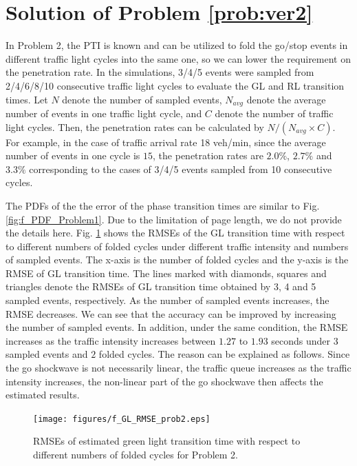 \documentclass[final,oneside,onecolumn,12pt,a4paper]{book}%
\begin{document}
\section{Solution of Problem \ref{prob:ver2}}

In Problem 2, the PTI is known and can be utilized to fold the go/stop events
in different traffic light cycles into the same one, so we can lower the
requirement on the penetration rate. In the simulations, 3/4/5 events were
sampled from 2/4/6/8/10 consecutive traffic light cycles to evaluate the GL
and RL transition times. Let $N$ denote the number of sampled events,
$N_{avg}$ denote the average number of events in one traffic light cycle, and
$C$ denote the number of traffic light cycles. Then, the penetration rates can
be calculated by $N/\left(  N_{avg}\times C\right)  $. For example, in the
case of traffic arrival rate 18 veh/min, since the average number of events in
one cycle is $15$, the penetration rates are $2.0\%$, $2.7\%$ and $3.3\%$
corresponding to the cases of 3/4/5 events sampled from 10 consecutive cycles.

The PDFs of the the error of the phase transition times are similar to Fig.
\ref{fig:f_PDF_Problem1}. Due to the limitation of page length, we do not
provide the details here. Fig. \ref{fig:f_GL_RMSE_prob2} shows the RMSEs of
the GL transition time with respect to different numbers of folded cycles
under different traffic intensity and numbers of sampled events. The x-axis is
the number of folded cycles and the y-axis is the RMSE of GL transition time.
The lines marked with diamonds, squares and triangles denote the RMSEs of GL
transition time obtained by 3, 4 and 5 sampled events, respectively. As the
number of sampled events increases, the RMSE decreases. We can see that the
accuracy can be improved by increasing the number of sampled events. In
addition, under the same condition, the RMSE increases as the traffic
intensity increases between $1.27$ to $1.93$ seconds under $3$ sampled events
and $2$ folded cycles. The reason can be explained as follows. Since the go
shockwave is not necessarily linear, the traffic queue increases as the
traffic intensity increases, the non-linear part of the go shockwave then
affects the estimated results.\begin{figure}[th]
\centerline{\texttt{[image: figures/f\_GL\_RMSE\_prob2.eps]}} \hfill\caption{RMSEs of estimated green light
transition time with respect to different numbers of folded cycles for Problem
2.}%
\label{fig:f_GL_RMSE_prob2}%
\end{figure}
\end{document}
